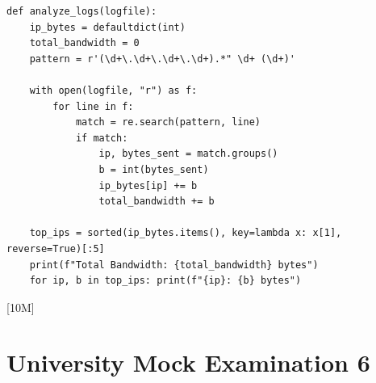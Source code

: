 \begin{solutionbox}
\begin{enumerate}[start=17]
\begin{lstlisting}[language=Python3]
def analyze_logs(logfile):
    ip_bytes = defaultdict(int)
    total_bandwidth = 0
    pattern = r'(\d+\.\d+\.\d+\.\d+).*" \d+ (\d+)'
    
    with open(logfile, "r") as f:
        for line in f:
            match = re.search(pattern, line)
            if match:
                ip, bytes_sent = match.groups()
                b = int(bytes_sent)
                ip_bytes[ip] += b
                total_bandwidth += b
                
    top_ips = sorted(ip_bytes.items(), key=lambda x: x[1], reverse=True)[:5]
    print(f"Total Bandwidth: {total_bandwidth} bytes")
    for ip, b in top_ips: print(f"{ip}: {b} bytes")
    \end{lstlisting} [10M]
\end{enumerate}
\end{solutionbox}

\section{University Mock Examination 6}

